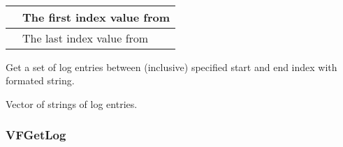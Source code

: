 \documentclass[letterpaper,10pt,english]{sphinxmanual}
\begin{document}
\begin{fulllineitems}
\label{\detokenize{log:_CPPv2N6pessum7VGetLogEii}}%
\pysigstartmultiline
{}%
\pysigstopmultiline~

\begin{savenotes}\sphinxattablestart
\centering
\begin{tabulary}{\linewidth}[t]{|T|T|}
\hline

&
The first index value from {\hyperref[\detokenize{log:_CPPv2N6pessum11global_logsE}]{}}
\\
\hline
{}
&
The last index value from {\hyperref[\detokenize{log:_CPPv2N6pessum11global_logsE}]{}}
\\
\hline
\end{tabulary}
\par
\sphinxattableend\end{savenotes}

Get a set of log entries between (inclusive) specified start and end index
with formated string.

 Vector of strings of log entries.

\end{fulllineitems}



\subsubsection{VFGetLog}
\label{\detokenize{log:vfgetlog}}
\end{document}
